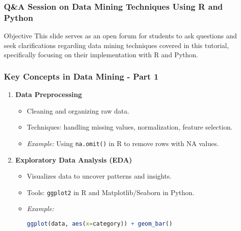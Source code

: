 \documentclass[aspectratio=169]{beamer}
\begin{document}
\begin{frame}[fragile]
    \frametitle{Q\&A Session on Data Mining Techniques Using R and Python}
    \begin{block}{Objective}
        This slide serves as an open forum for students to ask questions and seek clarifications regarding data mining techniques covered in this tutorial, specifically focusing on their implementation with R and Python.
    \end{block}
\end{frame}

\begin{frame}[fragile]
    \frametitle{Key Concepts in Data Mining - Part 1}
    \begin{enumerate}
        \item \textbf{Data Preprocessing}
        \begin{itemize}
            \item Cleaning and organizing raw data.
            \item Techniques: handling missing values, normalization, feature selection.
            \item \textit{Example:} Using \texttt{na.omit()} in R to remove rows with NA values.
        \end{itemize}
        
        \item \textbf{Exploratory Data Analysis (EDA)}
        \begin{itemize}
            \item Visualizes data to uncover patterns and insights.
            \item Tools: \texttt{ggplot2} in R and Matplotlib/Seaborn in Python.
            \item \textit{Example:} 
            \begin{lstlisting}[language=R]
ggplot(data, aes(x=category)) + geom_bar()
            \end{lstlisting}
        \end{itemize}
    \end{enumerate}
\end{frame}
\end{document}
